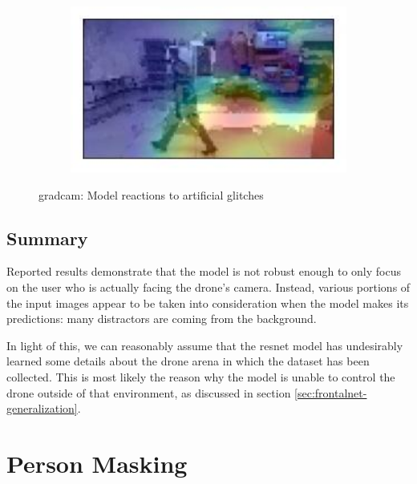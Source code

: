 \begin{figure}[!h]
\begin{center}
\begin{subfigure}[h]{0.24\textwidth}
		\end{subfigure}
		\hfill
		\begin{subfigure}[h]{0.24\textwidth}
			\centering
			\includegraphics[width=1\textwidth]{"contents/images/gradcam/gradcam-glitch-4"}
		\end{subfigure}
	\end{center}
	\vspace{-0.5cm}
	\caption[\gls{gradcam}: Model reactions to artificial glitches]{\gls{gradcam}: Model reactions to artificial glitches}
	\label{fig:gradcam-glitch}
\end{figure}



\subsection{Summary}
\label{subsec:gradcam-summary}

Reported results demonstrate that the model is not robust enough to only focus on the user who is actually facing the drone's camera. Instead, various portions of the input images appear to be taken into consideration when the model makes its predictions: many distractors are coming from the background.

In light of this, we can reasonably assume that the \gls{resnet} model has undesirably learned some details about the drone arena in which the dataset has been collected. This is most likely the reason why the model is unable to control the drone outside of that environment, as discussed in section \ref{sec:frontalnet-generalization}.




\section{Person Masking}
\label{sec:masking}

